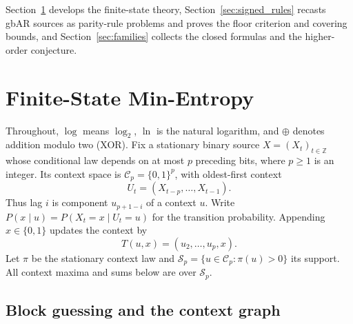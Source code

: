 \documentclass[11pt,a4paper]{article}
\begin{document}
Section~\ref{sec:finite_state} develops the finite-state theory,
Section~\ref{sec:signed_rules} recasts gbAR sources as parity-rule
problems and proves the floor criterion and covering bounds, and
Section~\ref{sec:families} collects the closed formulas and the
higher-order conjecture.

\section{Finite-State Min-Entropy}
\label{sec:finite_state}

Throughout, $\log$ means $\log_2$, $\ln$ is the natural logarithm,
and $\oplus$ denotes addition modulo two (XOR).  Fix a stationary
binary source $X=(X_t)_{t\in\mathbb Z}$ whose conditional law depends
on at most $p$ preceding bits, where $p\ge1$ is an integer.  Its context space is
$\mathcal C_p=\{0,1\}^p$, with oldest-first context
\[
    U_t=(X_{t-p},\ldots,X_{t-1}).
\]
Thus lag $i$ is component $u_{p+1-i}$ of a context $u$.  Write
$P(x\mid u)=P(X_t=x\mid U_t=u)$ for the transition probability.
Appending $x\in\{0,1\}$ updates the context by
\[
    T(u,x)=(u_2,\ldots,u_p,x).
\]
Let $\pi$ be the stationary context law and
$\mathcal S_p=\{u\in\mathcal C_p:\pi(u)>0\}$ its support.
All context maxima and sums below are over $\mathcal S_p$.

\subsection{Block guessing and the context graph}
\end{document}

